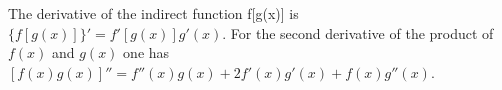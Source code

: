 \documentclass{article}
\begin{document}
The derivative of the indirect function f[g(x)] is
$\{f[g(x)]\}' = f'[g(x)]g'(x)$. For the second derivative of the product
of $f(x)$ and $g(x)$ one has 
$[f(x)g(x)]'' = f''(x)g(x) + 2f'(x)g'(x) + f(x)g''(x)$.
\end{document}
